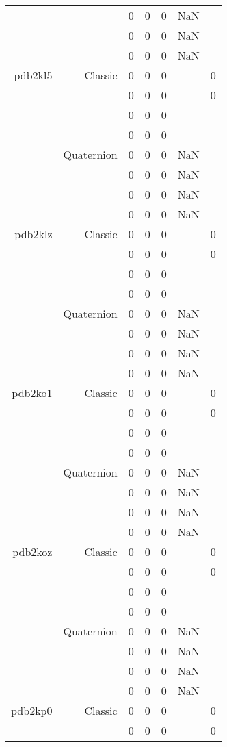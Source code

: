 \begin{xltabular}{\textwidth}{r|rcccSc}
& & 0 & 0 & 0 & NaN & \\
& & 0 & 0 & 0 & NaN & \\
& & 0 & 0 & 0 & NaN & \\ \addlinespace
pdb2kl5 & Classic & 0 & 0 & 0 & & 0 \\
& & 0 & 0 & 0 & & 0 \\
& & 0 & 0 & 0 & & \\
& & 0 & 0 & 0 & & \\
& Quaternion & 0 & 0 & 0 & NaN & \\
& & 0 & 0 & 0 & NaN & \\
& & 0 & 0 & 0 & NaN & \\
& & 0 & 0 & 0 & NaN & \\ \addlinespace
pdb2klz & Classic & 0 & 0 & 0 & & 0 \\
& & 0 & 0 & 0 & & 0 \\
& & 0 & 0 & 0 & & \\
& & 0 & 0 & 0 & & \\
& Quaternion & 0 & 0 & 0 & NaN & \\
& & 0 & 0 & 0 & NaN & \\
& & 0 & 0 & 0 & NaN & \\
& & 0 & 0 & 0 & NaN & \\ \addlinespace
pdb2ko1 & Classic & 0 & 0 & 0 & & 0 \\
& & 0 & 0 & 0 & & 0 \\
& & 0 & 0 & 0 & & \\
& & 0 & 0 & 0 & & \\
& Quaternion & 0 & 0 & 0 & NaN & \\
& & 0 & 0 & 0 & NaN & \\
& & 0 & 0 & 0 & NaN & \\
& & 0 & 0 & 0 & NaN & \\ \addlinespace
pdb2koz & Classic & 0 & 0 & 0 & & 0 \\
& & 0 & 0 & 0 & & 0 \\
& & 0 & 0 & 0 & & \\
& & 0 & 0 & 0 & & \\
& Quaternion & 0 & 0 & 0 & NaN & \\
& & 0 & 0 & 0 & NaN & \\
& & 0 & 0 & 0 & NaN & \\
& & 0 & 0 & 0 & NaN & \\ \addlinespace
pdb2kp0 & Classic & 0 & 0 & 0 & & 0 \\
& & 0 & 0 & 0 & & 0 \\

\end{xltabular}
